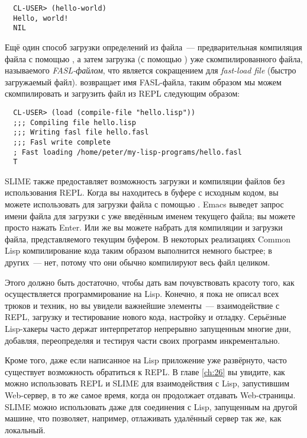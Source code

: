 \begin{verbatim}
  CL-USER> (hello-world)
  Hello, world!
  NIL
\end{verbatim}

Ещё один способ загрузки определений из файла~--- предварительная компиляция файла с помощью
, а затем загрузка (с помощью ) уже скомпилированного файла, называемого
\emph{FASL-файлом}, что является сокращением для \emph{fast-load file} (быстро загружаемый
файл).  возвращает имя FASL-файла, таким образом мы можем скомпилировать и
загрузить файл из REPL следующим образом:

\begin{verbatim}
  CL-USER> (load (compile-file "hello.lisp"))
  ;;; Compiling file hello.lisp
  ;;; Writing fasl file hello.fasl
  ;;; Fasl write complete
  ; Fast loading /home/peter/my-lisp-programs/hello.fasl
  T
\end{verbatim}

SLIME также предоставляет возможность загрузки и компиляции файлов без использования
REPL. Когда вы находитесь в буфере с исходным кодом, вы можете использовать  для
загрузки файла с помощью . Emacs выведет запрос имени файла для загрузки с
уже введённым именем текущего файла; вы можете просто нажать Enter. Или же вы можете
набрать  для компиляции и загрузки файла, представляемого текущим буфером. В
некоторых реализациях Common Lisp компилирование кода таким образом выполнится немного
быстрее; в других~--- нет, потому что они обычно компилируют весь файл целиком.

Этого должно быть достаточно, чтобы дать вам почувствовать красоту того, как
осуществляется программирование на Lisp. Конечно, я пока не описал всех трюков и техник,
но вы увидели важнейшие элементы~--- взаимодействие с REPL, загрузку и тестирование нового
кода, настройку и отладку. Серьёзные Lisp-хакеры часто держат интерпретатор непрерывно
запущенным многие дни, добавляя, переопределяя и тестируя части своих программ
инкрементально.

Кроме того, даже если написанное на Lisp приложение уже развёрнуто, часто существует
возможность обратиться к REPL. В главе \ref{ch:26} вы увидите, как можно использовать REPL и SLIME
для взаимодействия с Lisp, запустившим Web-сервер, в то же самое время, когда он
продолжает отдавать Web-страницы. SLIME можно использовать даже для соединения с Lisp,
запущенным на другой машине, что позволяет, например, отлаживать удалённый сервер так же,
как локальный.


